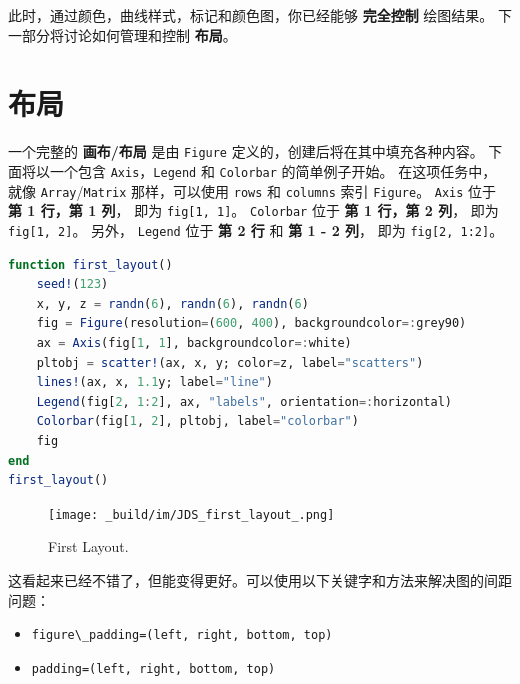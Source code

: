 \documentclass[
  notoc %
]{tufte-book}
\providecommand{\tightlist}{%
  \setlength{\itemsep}{0pt}\setlength{\parskip}{0pt}
}
\newcommand{\passthrough}[1]{#1}
\begin{document}
此时，通过颜色，曲线样式，标记和颜色图，你已经能够 \textbf{完全控制}
绘图结果。 下一部分将讨论如何管理和控制 \textbf{布局}。

\hypertarget{sec:makie_layouts}{%
\section{布局}\label{sec:makie_layouts}}

一个完整的 \textbf{画布/布局} 是由 \passthrough{\lstinline!Figure!}
定义的，创建后将在其中填充各种内容。 下面将以一个包含
\passthrough{\lstinline!Axis!}，\passthrough{\lstinline!Legend!} 和
\passthrough{\lstinline!Colorbar!} 的简单例子开始。 在这项任务中， 就像
\passthrough{\lstinline!Array!}/\passthrough{\lstinline!Matrix!}
那样，可以使用 \passthrough{\lstinline!rows!} 和
\passthrough{\lstinline!columns!} 索引
\passthrough{\lstinline!Figure!}。 \passthrough{\lstinline!Axis!} 位于
\textbf{第 1 行，第 1 列}， 即为 \passthrough{\lstinline!fig[1, 1]!}。
\passthrough{\lstinline!Colorbar!} 位于 \textbf{第 1 行，第 2 列}， 即为
\passthrough{\lstinline!fig[1, 2]!}。 另外，
\passthrough{\lstinline!Legend!} 位于 \textbf{第 2 行} 和 \textbf{第 1 -
2 列}， 即为 \passthrough{\lstinline!fig[2, 1:2]!}。

\begin{lstlisting}[language=Julia]
function first_layout()
    seed!(123)
    x, y, z = randn(6), randn(6), randn(6)
    fig = Figure(resolution=(600, 400), backgroundcolor=:grey90)
    ax = Axis(fig[1, 1], backgroundcolor=:white)
    pltobj = scatter!(ax, x, y; color=z, label="scatters")
    lines!(ax, x, 1.1y; label="line")
    Legend(fig[2, 1:2], ax, "labels", orientation=:horizontal)
    Colorbar(fig[1, 2], pltobj, label="colorbar")
    fig
end
first_layout()
\end{lstlisting}

\begin{figure}
\hypertarget{fig:first_layout}{%
\centering
\texttt{[image: \_build/im/JDS\_first\_layout\_.png]}
\caption{First Layout.}\label{fig:first_layout}
}
\end{figure}

这看起来已经不错了，但能变得更好。可以使用以下关键字和方法来解决图的间距问题：

\begin{itemize}
\tightlist
\item
  \passthrough{\lstinline!figure\_padding=(left, right, bottom, top)!}
\item
  \passthrough{\lstinline!padding=(left, right, bottom, top)!}
\end{itemize}
\end{document}
